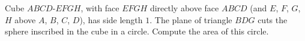 Cube $ABCD\text{-}EFGH$, with face $EFGH$ directly above face $ABCD$ (and $E$, $F$, $G$, $H$ above $A$, $B$, $C$, $D$), has side length $1$. The plane of triangle $BDG$ cuts the sphere inscribed in the cube in a circle. Compute the area of this circle.
